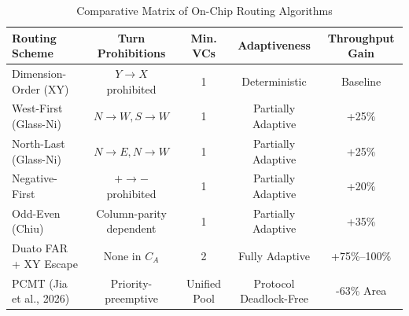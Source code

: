 \begin{table}[htbp]
\centering
\caption{Comparative Matrix of On-Chip Routing Algorithms}
\label{tab:ch5_routing}
\begin{tabular}{lcccc}
\toprule
\textbf{Routing Scheme} & \textbf{Turn Prohibitions} & \textbf{Min. VCs} & \textbf{Adaptiveness} & \textbf{Throughput Gain} \\
\midrule
Dimension-Order (XY) & $Y \to X$ prohibited & 1 & Deterministic & Baseline \\
West-First (Glass-Ni) & $N \to W, S \to W$ & 1 & Partially Adaptive & +25\% \\
North-Last (Glass-Ni) & $N \to E, N \to W$ & 1 & Partially Adaptive & +25\% \\
Negative-First & $+ \to -$ prohibited & 1 & Partially Adaptive & +20\% \\
Odd-Even (Chiu) & Column-parity dependent & 1 & Partially Adaptive & +35\% \\
Duato FAR + XY Escape & None in $C_A$ & 2 & Fully Adaptive & +75\%--100\% \\
PCMT (Jia et al., 2026) & Priority-preemptive & Unified Pool & Protocol Deadlock-Free & -63\% Area \\
\bottomrule
\end{tabular}
\end{table}

